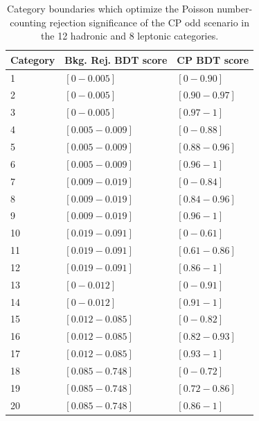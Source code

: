 \begin{table}[ht]
\begin{center}
\begin{tabular}{lll}
Category & Bkg. Rej. BDT score & CP BDT score \\ \hline
1 & $\left[0 - 0.005\right]$ & $\left[0 - 0.90\right]$ \\
2 & $\left[0 - 0.005\right]$ & $\left[0.90 - 0.97\right]$ \\
3 & $\left[0 - 0.005\right]$ & $\left[0.97 - 1 \right]$ \\
4 & $\left[0.005 - 0.009\right]$ & $\left[0 - 0.88 \right]$ \\
5 & $\left[0.005 - 0.009\right]$ & $\left[0.88 - 0.96\right]$ \\
6 & $\left[0.005 - 0.009\right]$ & $\left[0.96 - 1\right]$ \\
7 & $\left[0.009 - 0.019\right]$ & $\left[0 - 0.84 \right]$ \\
8 & $\left[0.009 - 0.019\right]$ & $\left[0.84 - 0.96\right]$ \\
9 & $\left[0.009 - 0.019\right]$ & $\left[0.96 - 1\right]$ \\
10 & $\left[0.019 - 0.091\right]$ & $\left[0 - 0.61 \right]$ \\
11 & $\left[0.019 - 0.091 \right]$ & $\left[0.61 - 0.86\right]$ \\
12 & $\left[0.019 - 0.091 \right]$ & $\left[0.86 - 1\right]$ \\ \hline
13 & $\left[0 - 0.012\right]$ & $\left[0 - 0.91 \right]$ \\
14 & $\left[0 - 0.012 \right]$ & $\left[0.91 - 1\right]$ \\
15 & $\left[0.012 - 0.085\right]$ & $\left[0 - 0.82\right]$ \\
16 & $\left[0.012 - 0.085\right]$ & $\left[0.82 - 0.93 \right]$ \\
17 & $\left[0.012 - 0.085\right]$ & $\left[0.93 - 1\right]$ \\
18 & $\left[0.085 - 0.748\right]$ & $\left[0 - 0.72\right]$ \\
19 & $\left[0.085 - 0.748\right]$ & $\left[0.72 - 0.86\right]$ \\
20 & $\left[0.085 - 0.748\right]$ & $\left[0.86 - 1 \right]$ \\  \hline
\hline
\end{tabular}
\end{center}
\vspace{-0.5cm}
\caption{Category boundaries which optimize the Poisson number-counting rejection significance of the CP odd scenario in the 12 hadronic and 8 leptonic categories.}
\label{tab:boundaries}
\end{table}

